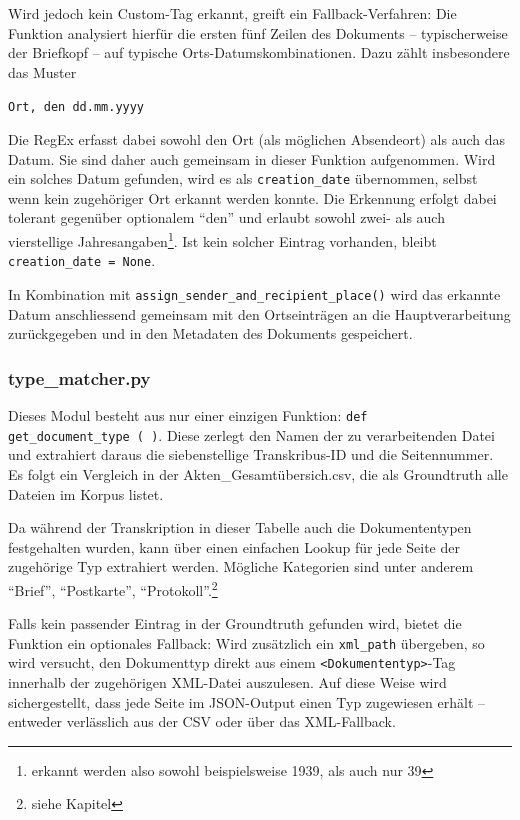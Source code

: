 \documentclass[12pt, a4paper, ngerman, bidi=default]{article}
\newcommand{\code}[1]{\colorbox{VeryLightGray}{\texttt{#1}}} %
\begin{document}
Wird jedoch kein Custom-Tag erkannt, greift ein Fallback-Verfahren: Die Funktion analysiert hierfür die ersten fünf Zeilen des Dokuments – typischerweise der Briefkopf – auf typische Orts-Datumskombinationen. Dazu zählt insbesondere das Muster

\begin{center}
\texttt{Ort, den dd.mm.yyyy}
\end{center}

\noindent Die RegEx erfasst dabei sowohl den Ort (als möglichen Absendeort) als auch das Datum. Sie sind daher auch gemeinsam in dieser Funktion aufgenommen. Wird ein solches Datum gefunden, wird es als \code{creation\_date} übernommen, selbst wenn kein zugehöriger Ort erkannt werden konnte. Die Erkennung erfolgt dabei tolerant gegenüber optionalem \enquote{den} und erlaubt sowohl zwei- als auch vierstellige Jahresangaben\footnote{erkannt werden also sowohl beispielsweise 1939, als auch nur 39}. Ist kein solcher Eintrag vorhanden, bleibt \code{creation\_date = None}.

In Kombination mit \code{assign\_sender\_and\_recipient\_place()} wird das erkannte Datum anschliessend gemeinsam mit den Ortseinträgen an die Hauptverarbeitung zurückgegeben und in den Metadaten des Dokuments gespeichert.


\subsubsection{type\_matcher.py}\label{subsection:type_matcher}
Dieses Modul besteht aus nur einer einzigen Funktion: \code{def get\_document\_type~(~)}. Diese zerlegt den Namen der zu verarbeitenden Datei und extrahiert daraus die siebenstellige Transkribus-ID und die Seitennummer. Es folgt ein Vergleich in der Akten\_Gesamtübersich.csv, die als Groundtruth alle Dateien im Korpus listet.

Da während der Transkription in dieser Tabelle auch die Dokumententypen festgehalten wurden, kann über einen einfachen Lookup für jede Seite der zugehörige Typ extrahiert werden. Mögliche Kategorien sind unter anderem \enquote{Brief}, \enquote{Postkarte}, \enquote{Protokoll}.\footnote{siehe Kapitel } 

Falls kein passender Eintrag in der Groundtruth gefunden wird, bietet die Funktion ein optionales Fallback: Wird zusätzlich ein \code{xml\_path} übergeben, so wird versucht, den Dokumenttyp direkt aus einem \code{<Dokumententyp>}-Tag innerhalb der zugehörigen XML-Datei auszulesen. Auf diese Weise wird sichergestellt, dass jede Seite im JSON-Output einen Typ zugewiesen erhält – entweder verlässlich aus der CSV oder über das XML-Fallback.
\end{document}
